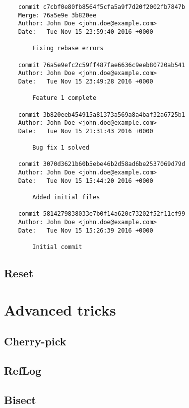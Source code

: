 \documentclass{article}
\begin{document}
\begin{lstlisting}
	commit c7cbf0e80fb8564f5cfa5a9f7d20f2002fb7847b
	Merge: 76a5e9e 3b820ee
	Author: John Doe <john.doe@example.com>
	Date:   Tue Nov 15 23:59:40 2016 +0000

    	Fixing rebase errors

	commit 76a5e9efc2c59ff487fae6636c9eeb80720ab541
	Author: John Doe <john.doe@example.com>
	Date:   Tue Nov 15 23:49:28 2016 +0000

    	Feature 1 complete

	commit 3b820eeb454915a81373a569a8a4baf32a6725b1
	Author: John Doe <john.doe@example.com>
	Date:   Tue Nov 15 21:31:43 2016 +0000

    	Bug fix 1 solved

	commit 3070d3621b60b5ebe46b2d58ad6be2537069d79d
	Author: John Doe <john.doe@example.com>
	Date:   Tue Nov 15 15:44:20 2016 +0000

    	Added initial files

	commit 5814279838033e7b0f14a620c73202f52f11cf99
	Author: John Doe <john.doe@example.com>
	Date:   Tue Nov 15 15:26:39 2016 +0000

    	Initial commit
\end{lstlisting}

\subsection{Reset}

\section{Advanced tricks}

\subsection{Cherry-pick}

\subsection{RefLog}

\subsection{Bisect}

\subsection{}
\end{document}
